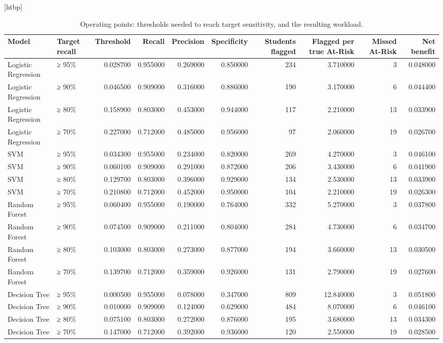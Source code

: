 \begin{table}
\small[htbp]
\caption{Operating points: thresholds needed to reach target sensitivity, and the resulting workload.}
\label{tab:S21_operating_points}
\begin{tabular}{llrrrrrrrr}
\toprule
Model & Target recall & Threshold & Recall & Precision & Specificity & Students flagged & Flagged per true At-Risk & Missed At-Risk & Net benefit \\
\midrule
Logistic Regression & ≥ 95\% & 0.028700 & 0.955000 & 0.269000 & 0.850000 & 234 & 3.710000 & 3 & 0.048000 \\
Logistic Regression & ≥ 90\% & 0.046500 & 0.909000 & 0.316000 & 0.886000 & 190 & 3.170000 & 6 & 0.044400 \\
Logistic Regression & ≥ 80\% & 0.158900 & 0.803000 & 0.453000 & 0.944000 & 117 & 2.210000 & 13 & 0.033900 \\
Logistic Regression & ≥ 70\% & 0.227000 & 0.712000 & 0.485000 & 0.956000 & 97 & 2.060000 & 19 & 0.026700 \\
SVM & ≥ 95\% & 0.034300 & 0.955000 & 0.234000 & 0.820000 & 269 & 4.270000 & 3 & 0.046100 \\
SVM & ≥ 90\% & 0.060100 & 0.909000 & 0.291000 & 0.872000 & 206 & 3.430000 & 6 & 0.041900 \\
SVM & ≥ 80\% & 0.129700 & 0.803000 & 0.396000 & 0.929000 & 134 & 2.530000 & 13 & 0.033900 \\
SVM & ≥ 70\% & 0.210800 & 0.712000 & 0.452000 & 0.950000 & 104 & 2.210000 & 19 & 0.026300 \\
Random Forest & ≥ 95\% & 0.060400 & 0.955000 & 0.190000 & 0.764000 & 332 & 5.270000 & 3 & 0.037800 \\
Random Forest & ≥ 90\% & 0.074500 & 0.909000 & 0.211000 & 0.804000 & 284 & 4.730000 & 6 & 0.034700 \\
Random Forest & ≥ 80\% & 0.103000 & 0.803000 & 0.273000 & 0.877000 & 194 & 3.660000 & 13 & 0.030500 \\
Random Forest & ≥ 70\% & 0.139700 & 0.712000 & 0.359000 & 0.926000 & 131 & 2.790000 & 19 & 0.027600 \\
Decision Tree & ≥ 95\% & 0.000500 & 0.955000 & 0.078000 & 0.347000 & 809 & 12.840000 & 3 & 0.051800 \\
Decision Tree & ≥ 90\% & 0.010000 & 0.909000 & 0.124000 & 0.629000 & 484 & 8.070000 & 6 & 0.046100 \\
Decision Tree & ≥ 80\% & 0.075100 & 0.803000 & 0.272000 & 0.876000 & 195 & 3.680000 & 13 & 0.034300 \\
Decision Tree & ≥ 70\% & 0.147000 & 0.712000 & 0.392000 & 0.936000 & 120 & 2.550000 & 19 & 0.028500 \\

\end{tabular}
\end{table}
